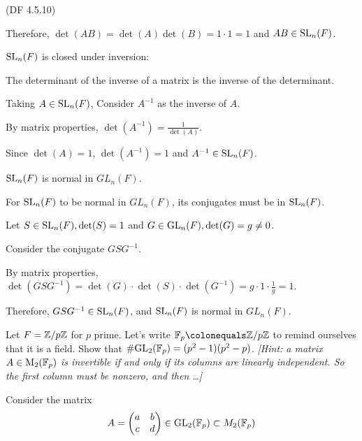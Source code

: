 \begin{problem}{(\textsf{DF 4.5.10})}
\begin{enumalph}
\begin{Answer}
\begin{enumalph}
            \noindent
            Therefore, $\det(AB) = \det(A) \det(B) = 1 \cdot 1 = 1$ and $AB \in \operatorname{SL}_n(F)$.
          \item  $\operatorname{SL}_n(F)$ is closed under inversion:
        
            \noindent
            The determinant of the inverse of a matrix is the inverse of the determinant.

            \noindent
            Taking $A \in \operatorname{SL}_n(F)$, Consider $A^{-1}$ as the inverse of $A$.
            
            \noindent
            By matrix properties, $\det(A^{-1}) = \frac{1}{\det(A)}$.
            
            \noindent
            Since $\det(A) = 1$, $\det(A^{-1}) = 1$ and $A^{-1} \in \operatorname{SL}_n(F)$.
          
          \item  $\operatorname{SL}_n(F)$ is normal in $GL_n(F)$.
          
          For  $\operatorname{SL}_n(F)$ to be normal in $GL_n(F)$, its conjugates must be in  $\operatorname{SL}_n(F)$.
          
          Let $S \in \operatorname{SL}_n(F), \det(S) = 1$ and $G \in \mathrm{GL}_n(F), \det(G) = g \neq 0$.

          \noindent
          Consider the conjugate $GSG^{-1}$.
          
          \noindent
          By matrix properties, $\det(GSG^{-1}) = \det(G) \cdot \det(S) \cdot \det(G^{-1}) = g \cdot 1 \cdot \frac{1}{g} = 1$.

          \noindent
          Therefore, $GSG^{-1} \in \operatorname{SL}_n(F)$, and  $\operatorname{SL}_n(F)$ is normal in $GL_n(F)$.
          
        \end{enumalph}
      \end{Answer}
      
    \newpage
    \item Let $F=\mathbb{Z}/p\mathbb{Z}$ for $p$ prime.
      Let's write $\F_p \colonequals \Z/p\Z$ to remind ourselves that it is a field.
      Show that $\#\mathrm{GL}_2(\mathbb{F}_p)=(p^2-1)(p^2-p)$.
      \emph{[Hint: a matrix $A \in \operatorname{M}_2(\mathbb{F}_p)$ is invertible if and only if its columns 
      are linearly independent.  So the first column must be nonzero, and then \ldots ]}

      \begin{Answer}
        Consider the matrix \[A = \begin{pmatrix} a & b \\ c & d \end{pmatrix} \in \mathrm{GL}_2(\mathbb{F}_p) \subset M_2(\mathbb{F}_p)\]


\end{Answer}
\end{enumalph}
\end{problem}
